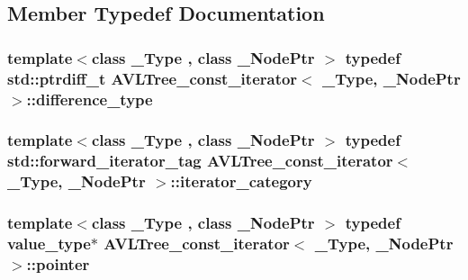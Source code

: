 \subsection{Member Typedef Documentation}
\hypertarget{class_a_v_l_tree__const__iterator_a4373b7d2f957d78030ee9dbd86fc307e}{}
\subsubsection[{difference\+\_\+type}]{\setlength{\rightskip}{0pt plus 5cm}template$<$class \+\_\+\+Type , class \+\_\+\+Node\+Ptr $>$ typedef std\+::ptrdiff\+\_\+t {\bf A\+V\+L\+Tree\+\_\+const\+\_\+iterator}$<$ \+\_\+\+Type, \+\_\+\+Node\+Ptr $>$\+::{\bf difference\+\_\+type}}\label{class_a_v_l_tree__const__iterator_a4373b7d2f957d78030ee9dbd86fc307e}
\hypertarget{class_a_v_l_tree__const__iterator_aa2d12330a9ba748729e42d8fc882c98e}{}
\subsubsection[{iterator\+\_\+category}]{\setlength{\rightskip}{0pt plus 5cm}template$<$class \+\_\+\+Type , class \+\_\+\+Node\+Ptr $>$ typedef std\+::forward\+\_\+iterator\+\_\+tag {\bf A\+V\+L\+Tree\+\_\+const\+\_\+iterator}$<$ \+\_\+\+Type, \+\_\+\+Node\+Ptr $>$\+::{\bf iterator\+\_\+category}}\label{class_a_v_l_tree__const__iterator_aa2d12330a9ba748729e42d8fc882c98e}
\hypertarget{class_a_v_l_tree__const__iterator_a0fbfdccc80380ae68a44281dcc18e770}{}
\subsubsection[{pointer}]{\setlength{\rightskip}{0pt plus 5cm}template$<$class \+\_\+\+Type , class \+\_\+\+Node\+Ptr $>$ typedef {\bf value\+\_\+type}$\ast$ {\bf A\+V\+L\+Tree\+\_\+const\+\_\+iterator}$<$ \+\_\+\+Type, \+\_\+\+Node\+Ptr $>$\+::{\bf pointer}}\label{class_a_v_l_tree__const__iterator_a0fbfdccc80380ae68a44281dcc18e770}
\hypertarget{class_a_v_l_tree__const__iterator_a60f81dd86cc602fcc95a298df957990b}{}
